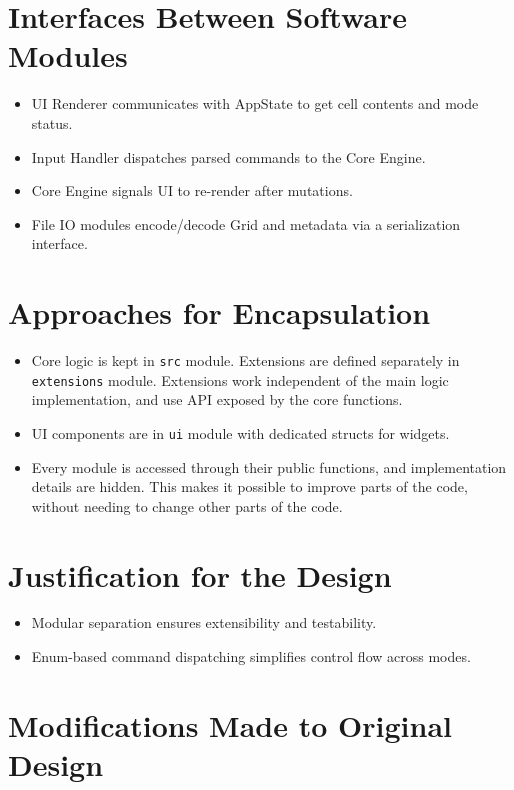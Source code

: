 \documentclass[12pt]{article}
\begin{document}
\section{Interfaces Between Software Modules}

\begin{itemize}
\item UI Renderer communicates with AppState to get cell contents and mode status.
\item Input Handler dispatches parsed commands to the Core Engine.
\item Core Engine signals UI to re-render after mutations.
\item File IO modules encode/decode Grid and metadata via a serialization interface.
\end{itemize}

\section{Approaches for Encapsulation}

\begin{itemize}
\item Core logic is kept in \texttt{src} module. Extensions are defined separately in \texttt{extensions} module. Extensions work independent of the main logic implementation, and use API exposed by the core functions.
\item UI components are in \texttt{ui} module with dedicated structs for widgets.
\item Every module is accessed through their public functions, and implementation details are hidden. This makes it possible to improve parts of the code, without needing to change other parts of the code.
\end{itemize}

\section{Justification for the Design}

\begin{itemize}
\item Modular separation ensures extensibility and testability.
\item Enum-based command dispatching simplifies control flow across modes.
\end{itemize}

\section{Modifications Made to Original Design}
\end{document}
